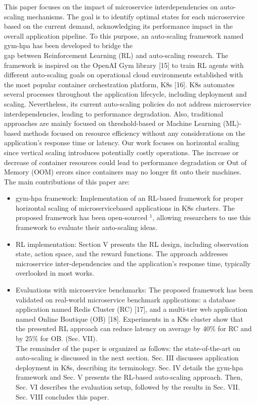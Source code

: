\documentclass[10pt]{article}
\begin{document}
This paper focuses on the impact of microservice interdependencies on auto-scaling mechanisms. The goal is to identify optimal states for each microservice based on the current demand, acknowledging its performance impact in the overall application pipeline. To this purpose, an auto-scaling framework named gym-hpa has been developed to bridge the\\[0pt]
gap between Reinforcement Learning (RL) and auto-scaling research. The framework is inspired on the OpenAI Gym library [15] to train RL agents with different auto-scaling goals on operational cloud environments established with the most popular container orchestration platform, K8s [16]. K8s automates several processes throughout the application lifecycle, including deployment and scaling. Nevertheless, its current auto-scaling policies do not address microservice interdependencies, leading to performance degradation. Also, traditional approaches are mainly focused on threshold-based or Machine Learning (ML)-based methods focused on resource efficiency without any considerations on the application's response time or latency. Our work focuses on horizontal scaling since vertical scaling introduces potentially costly operations. The increase or decrease of container resources could lead to performance degradation or Out of Memory (OOM) errors since containers may no longer fit onto their machines. The main contributions of this paper are:

\begin{itemize}
  \item gym-hpa framework: Implementation of an RL-based framework for proper horizontal scaling of microservicebased applications in K8s clusters. The proposed framework has been open-sourced ${ }^{1}$, allowing researchers to use this framework to evaluate their auto-scaling ideas.
  \item RL implementation: Section V presents the RL design, including observation state, action space, and the reward functions. The approach addresses microservice inter-dependencies and the application's response time, typically overlooked in most works.
  \item Evaluations with microservice benchmarks: The proposed framework has been validated on real-world microservice benchmark applications: a database application named Redis Cluster (RC) [17], and a multi-tier web application named Online Boutique (OB) [18]. Experiments in a K8s cluster show that the presented RL approach can reduce latency on average by $40 \%$ for RC and by $25 \%$ for OB. (Sec. VII).\\
The remainder of the paper is organized as follows: the state-of-the-art on auto-scaling is discussed in the next section. Sec. III discusses application deployment in K8s, describing its terminology. Sec. IV details the gym-hpa framework and Sec. V presents the RL-based auto-scaling approach. Then, Sec. VI describes the evaluation setup, followed by the results in Sec. VII. Sec. VIII concludes this paper.
\end{itemize}
\end{document}
